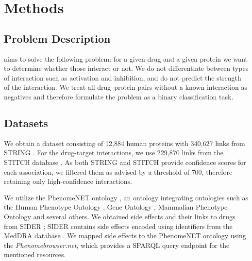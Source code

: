 \documentclass{bioinfo}
\renewcommand{\cite}{\citep}
\begin{document}



\enlargethispage{12pt}

\section{Methods}
\subsection{Problem Description}
\name{} aims to solve the following problem: for a given drug and a
given protein we want to determine whether those interact or not.  We
do not differentiate between types of interaction such as activation
and inhibition, and do not predict the strength of the interaction.
We treat all drug--protein pairs without a known interaction as
negatives and therefore formulate the problem as a binary
classification task.

\subsection{Datasets}
We obtain a dataset consisting of 12,884 human proteins with 
340,627 links from STRING \citep{STRINGv10}. For the drug-target
interactions, we use 229,870 links from the STITCH database
\citep{STITCHv5}. As both STRING and STITCH provide confidence scores
for each association, we filtered them as advised by a threshold of
$700$, therefore retaining only high-confidence interactions.

We utilize the PhenomeNET ontology \citep{PhenomeNET2011}, an ontology
integrating ontologies such as the Human Phenotype Ontology
\citep{HPO2018}, Gene Ontology \cite{GOoriginal2000, GOrecent2020},
Mammalian Phenotype Ontology \citep{MP2009} and several others.  We
obtained side effects and their links to drugs from SIDER
\citep{SIDER}; SIDER contains side effects encoded using identifiers
from the MedDRA database \citep{MedDRA}. We mapped side effects to the
PhenomeNET ontology using the \textit{Phenomebrowser.net}, which
provides a SPARQL query endpoint for the mentioned resources.
\end{document}
